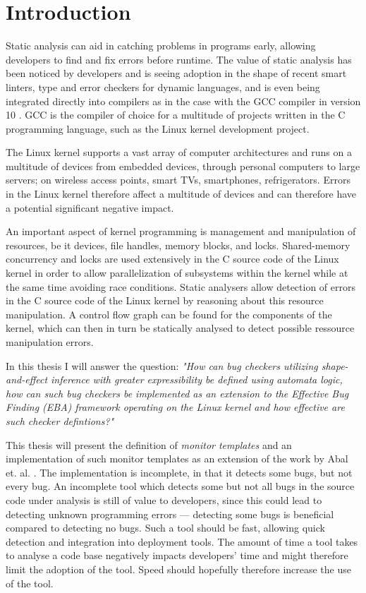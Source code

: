 \section{Introduction}

\newpar Static analysis can aid in catching problems in programs early, allowing developers to find and fix errors before runtime. The value of static analysis has been noticed by developers and is seeing adoption in the shape of recent smart linters, type and error checkers for dynamic languages, and is even being integrated directly into compilers as in the case with the GCC compiler in version 10 \cite{gcc10}. GCC is the compiler of choice for a multitude of projects written in the C programming language, such as the Linux kernel development project. 

\newpar The Linux kernel supports a vast array of computer architectures and runs on a multitude of devices from embedded devices, through personal computers to large servers; on wireless access points, smart TVs, smartphones, refrigerators. Errors in the Linux kernel therefore affect a multitude of devices and can therefore have a potential significant negative impact.

\newpar An important aspect of kernel programming is management and manipulation of resources, be it devices, file handles, memory blocks, and locks. Shared-memory concurrency and locks are used extensively in the C source code of the Linux kernel in order to allow parallelization of subsystems within the kernel while at the same time avoiding race conditions. Static analysers allow detection of errors in the C source code of the Linux kernel by reasoning about this resource manipulation. A control flow graph can be found for the components of the kernel, which can then in turn be statically analysed to detect possible ressource manipulation errors. 

\newpar In this thesis I will answer the question: \textit{"How can bug checkers utilizing shape-and-effect inference with greater expressibility be defined using automata logic, how can such bug checkers be implemented as an extension to the Effective Bug Finding (EBA) framework operating on the Linux kernel and how effective are such checker defintions?"}

\newpar This thesis will present the definition of \textit{monitor templates} and an implementation of such monitor templates as an extension of the work by Abal et. al. \cite{Abal2017EffectiveBF}. The implementation is incomplete, in that it detects some bugs, but not every bug. An incomplete tool which detects some but not all bugs in the source code under analysis is still of value to developers, since this could lead to detecting unknown programming errors --- detecting some bugs is beneficial compared to detecting no bugs. Such a tool should be fast, allowing quick detection and integration into deployment tools. The amount of time a tool takes to analyse a code base negatively impacts developers' time and might therefore limit the adoption of the tool. Speed should hopefully therefore increase the use of the tool. 

